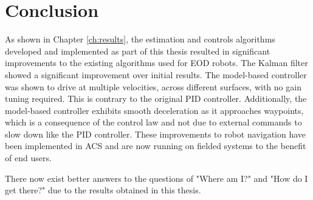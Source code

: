 \chapter{Conclusion}
\label{ch:conclusion}
As shown in Chapter \ref{ch:results}, the estimation and controls algorithms developed and implemented as part of this thesis resulted in significant improvements to the existing algorithms used for EOD robots. The Kalman filter showed a significant improvement over initial results. The model-based controller was shown to drive at multiple velocities, across different surfaces, with no gain tuning required. This is contrary to the original PID controller. Additionally, the model-based controller exhibits smooth deceleration as it approaches waypoints, which is a consequence of the control law and not due to external commands to slow down like the PID controller. These improvements to robot navigation have been implemented in ACS and are now running on fielded systems to the benefit of end users.

There now exist better answers to the questions of "Where am I?" and "How do I get there?" due to the results obtained in this thesis.
